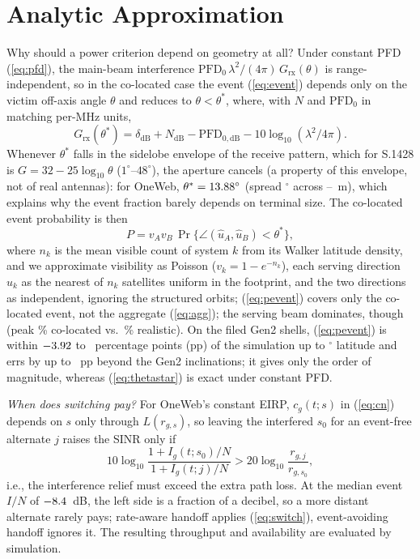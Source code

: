 \documentclass[conference]{IEEEtran}
\begin{document}
\section{Analytic Approximation}
\label{sec:analytic}
Why should a power criterion depend on geometry at all? Under constant PFD
(\ref{eq:pfd}), the main-beam interference
$\mathrm{PFD}_0\,\lambda^2/(4\pi)\,G_{\text{rx}}(\theta)$ is range-independent,
so in the co-located case the event (\ref{eq:event}) depends only on the victim
off-axis angle $\theta$ and reduces to $\theta < \theta^{*}$, where, with $N$
and $\mathrm{PFD}_0$ in matching per-MHz units,
\begin{equation}
G_{\text{rx}}(\theta^{*}) = \delta_{\text{dB}} + N_{\text{dB}} -
\mathrm{PFD}_{0,\text{dB}} - 10\log_{10}(\lambda^2/4\pi).
\label{eq:thetastar}
\end{equation}
Whenever $\theta^{*}$ falls in the sidelobe envelope of the receive pattern, which
for S.1428 is $G = 32 - 25\log_{10}\theta$ ($1^\circ$--$48^\circ$), the aperture
cancels (a property of this envelope, not of real antennas): for OneWeb, $\theta^{*} = 13.88^\circ$ (spread
\AnalyticThetaSpreadDeg$^\circ$ across \EirpHeadDiam--\AperMaxM~m), which explains
why the event fraction barely depends on terminal size. The co-located event
probability is then
\begin{equation}
P = v_A v_B\,\Pr\{\angle(\hat u_A,\hat u_B) < \theta^{*}\},
\label{eq:pevent}
\end{equation}
where $n_k$ is the mean visible count of system $k$ from its Walker latitude
density, and we approximate visibility as Poisson ($v_k = 1 - e^{-n_k}$), each
serving direction $\hat u_k$ as the nearest of $n_k$ satellites uniform in the
footprint, and the two directions as independent, ignoring the structured
orbits; (\ref{eq:pevent}) covers only the co-located event, not the aggregate
(\ref{eq:agg}); the serving beam dominates, though (peak \BindDepColoPct\%
co-located vs.\ \BindDepWorstPct\% realistic). On the filed Gen2 shells,
(\ref{eq:pevent}) is within $-3.92$ to \AnalyticSignedMaxInclPct\
percentage points (pp) of the simulation up to \AnalyticInclLatDeg$^\circ$
latitude and errs by up to \AnalyticMaxAbsBeyondPct~pp beyond the Gen2
inclinations; it gives only the order of magnitude, whereas (\ref{eq:thetastar}) is exact under constant PFD.

\emph{When does switching pay?} For OneWeb's constant EIRP, $c_g(t;s)$ in
(\ref{eq:cn}) depends on $s$ only through $L(r_{g,s})$, so leaving the interfered
$s_0$ for an event-free alternate $j$ raises the SINR only if
\begin{equation}
10\log_{10}\frac{1+I_g(t;s_0)/N}{1+I_g(t;j)/N} > 20\log_{10}\frac{r_{g,j}}{r_{g,s_0}},
\label{eq:switch}
\end{equation}
i.e., the interference relief must exceed the extra path loss. At the median
event $I/N$ of $-8.4$~dB, the left side is a fraction of a decibel, so a
more distant alternate rarely pays; rate-aware handoff applies
(\ref{eq:switch}), event-avoiding handoff ignores it. The resulting throughput
and availability are evaluated by simulation.
\end{document}
